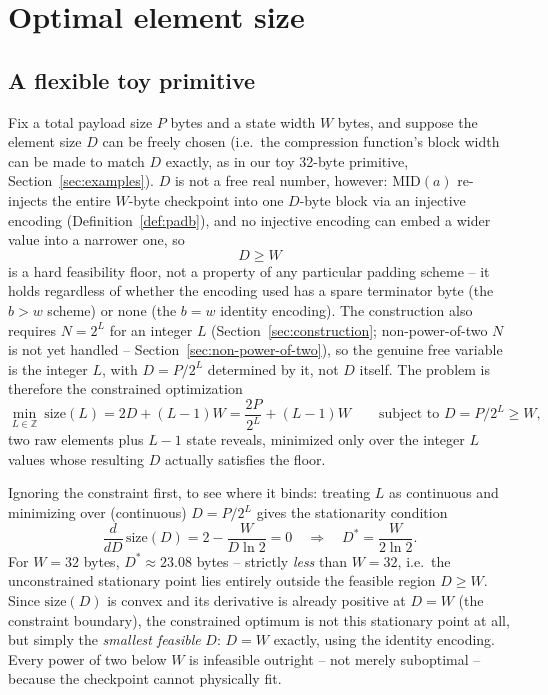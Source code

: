 \section{Optimal element size}
\label{sec:optimal-size}

\subsection{A flexible toy primitive}

Fix a total payload size $P$ bytes and a state width $W$ bytes, and suppose
the element size $D$ can be freely chosen (i.e.\ the compression function's
block width can be made to match $D$ exactly, as in our toy 32-byte
primitive, Section~\ref{sec:examples}). $D$ is not a free real number,
however: $\mathrm{MID}(a)$ re-injects the entire $W$-byte checkpoint into
one $D$-byte block via an injective encoding
(Definition~\ref{def:padb}), and no injective encoding can embed a wider
value into a narrower one, so
\begin{equation}
D \ge W
\end{equation}
is a hard feasibility floor, not a property of any particular padding
scheme -- it holds regardless of whether the encoding used has a spare
terminator byte (the $b>w$ scheme) or none (the $b=w$ identity encoding).
The construction also requires $N = 2^L$ for an integer $L$
(Section~\ref{sec:construction}; non-power-of-two $N$ is not yet handled --
Section~\ref{sec:non-power-of-two}), so the genuine free variable is the
integer $L$, with $D = P/2^L$ determined by it, not $D$ itself. The problem
is therefore the constrained optimization
\begin{equation}
\min_{L \in \mathbb{Z}}\ \mathrm{size}(L) = 2D + (L-1)W = \frac{2P}{2^L} + (L-1)W
\qquad \text{subject to } D = P/2^L \ge W,
\end{equation}
two raw elements plus $L-1$ state reveals, minimized only over the integer
$L$ values whose resulting $D$ actually satisfies the floor.

Ignoring the constraint first, to see where it binds: treating $L$ as
continuous and minimizing over (continuous) $D = P/2^L$ gives the
stationarity condition
\begin{equation}
\frac{d}{dD}\,\mathrm{size}(D) = 2 - \frac{W}{D \ln 2} = 0
\quad\Longrightarrow\quad
D^* = \frac{W}{2\ln 2}.
\end{equation}
For $W = 32$ bytes, $D^* \approx 23.08$ bytes -- strictly \emph{less} than
$W=32$, i.e.\ the unconstrained stationary point lies entirely outside the
feasible region $D \ge W$. Since $\mathrm{size}(D)$ is convex and its
derivative is already positive at $D=W$ (the constraint boundary), the
constrained optimum is not this stationary point at all, but simply the
\emph{smallest feasible} $D$: $D = W$ exactly, using the identity encoding.
Every power of two below $W$ is infeasible outright -- not merely
suboptimal -- because the checkpoint cannot physically fit.

